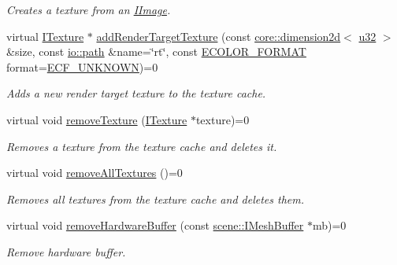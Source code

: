 \begin{DoxyCompactItemize}
\begin{DoxyCompactList}\small\item\em Creates a texture from an \hyperlink{classirr_1_1video_1_1IImage}{I\+Image}. \end{DoxyCompactList}\item 
virtual \hyperlink{classirr_1_1video_1_1ITexture}{I\+Texture} $\ast$ \hyperlink{classirr_1_1video_1_1IVideoDriver_aa704cece826ee37d02e4bb054b0b8797}{add\+Render\+Target\+Texture} (const \hyperlink{classirr_1_1core_1_1dimension2d}{core\+::dimension2d}$<$ \hyperlink{namespaceirr_a0416a53257075833e7002efd0a18e804}{u32} $>$ \&size, const \hyperlink{namespaceirr_1_1io_a6468281622ce3a1c46b72e19f32dded5}{io\+::path} \&name=\char`\"{}rt\char`\"{}, const \hyperlink{namespaceirr_1_1video_a1d5e487888c32b1674a8f75116d829ed}{E\+C\+O\+L\+O\+R\+\_\+\+F\+O\+R\+M\+AT} format=\hyperlink{namespaceirr_1_1video_a1d5e487888c32b1674a8f75116d829eda8d25e5e1e9c83f95c4f7d48e11688a51}{E\+C\+F\+\_\+\+U\+N\+K\+N\+O\+WN})=0
\begin{DoxyCompactList}\small\item\em Adds a new render target texture to the texture cache. \end{DoxyCompactList}\item 
virtual void \hyperlink{classirr_1_1video_1_1IVideoDriver_ac88319ec41daa23fef2ae935285afcc9}{remove\+Texture} (\hyperlink{classirr_1_1video_1_1ITexture}{I\+Texture} $\ast$texture)=0
\begin{DoxyCompactList}\small\item\em Removes a texture from the texture cache and deletes it. \end{DoxyCompactList}\item 
virtual void \hyperlink{classirr_1_1video_1_1IVideoDriver_a179990e76fa91175d46c891b3508e717}{remove\+All\+Textures} ()=0
\begin{DoxyCompactList}\small\item\em Removes all textures from the texture cache and deletes them. \end{DoxyCompactList}\item 
\mbox{\label{classirr_1_1video_1_1IVideoDriver_a1454ef5ba92de420f35678e2803485f6}} 
virtual void \hyperlink{classirr_1_1video_1_1IVideoDriver_a1454ef5ba92de420f35678e2803485f6}{remove\+Hardware\+Buffer} (const \hyperlink{classirr_1_1scene_1_1IMeshBuffer}{scene\+::\+I\+Mesh\+Buffer} $\ast$mb)=0
\begin{DoxyCompactList}\small\item\em Remove hardware buffer. \end{DoxyCompactList}\item 

\end{DoxyCompactItemize}
